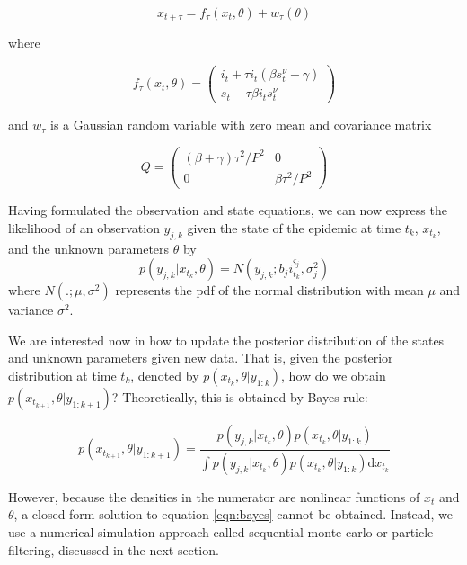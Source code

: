 \documentclass{article}
\begin{document}
\begin{equation}
x_{t+\tau} = f_\tau(x_t,\theta) + w_{\tau}(\theta) \label{eqn:state}
\end{equation}

\noindent where

\begin{equation}
f_\tau(x_t,\theta) = \left(
\begin{array}{c}
i_t + \tau i_t(\beta s^{\nu}_t - \gamma) \\
s_t - \tau\beta i_ts^{\nu}_t
\end{array}
\right) \label{eqn:f}
\end{equation}

\noindent and $w_\tau$ is a Gaussian random variable with zero mean and covariance matrix

\begin{equation}
Q = \left(
\begin{array}{ccccc}
(\beta + \gamma)\tau^2/P^2 & 0 \\
0 & \beta\tau^2/P^2
\end{array}
\right) \label{eqn:q}
\end{equation}

\noindent Having formulated the observation and state equations, we can now express the likelihood of an observation $y_{j,k}$ given the state of the epidemic at time $t_k$, $x_{t_k}$, and the unknown parameters $\theta$ by \[p(y_{j,k}|x_{t_k},\theta) = N(y_{j,k};b_ji^{\varsigma_j}_{t_k},\sigma^2_j)\] where $N(.;\mu,\sigma^2)$ represents the pdf of the normal distribution with mean $\mu$ and variance $\sigma^2$.

We are interested now in how to update the posterior distribution of the states and unknown parameters given new data.  That is, given the posterior distribution at time $t_k$, denoted by $p(x_{t_k},\theta|y_{1:k})$, how do we obtain $p(x_{t_{k+1}},\theta|y_{1:k+1})$?  Theoretically, this is obtained by Bayes rule:

\begin{equation}
p(x_{t_{k+1}},\theta|y_{1:k+1}) = \frac{p(y_{j,k}|x_{t_k},\theta)p(x_{t_k},\theta|y_{1:k})}{\int p(y_{j,k}|x_{t_k},\theta)p(x_{t_k},\theta|y_{1:k}) \mathrm{d} x_{t_k}} \label{eqn:bayes}
\end{equation}

\noindent However, because the densities in the numerator are nonlinear functions of $x_t$ and $\theta$, a closed-form solution to equation \eqref{eqn:bayes} cannot be obtained.  Instead, we use a numerical simulation approach called sequential monte carlo or particle filtering, discussed in the next section.
\end{document}
